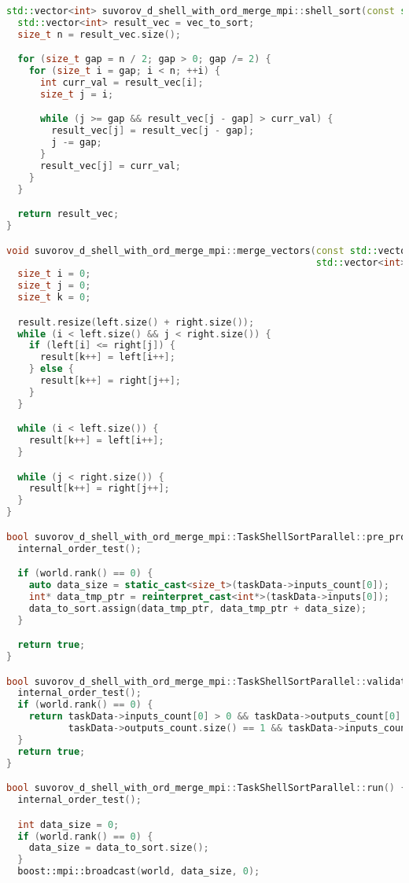 \documentclass{report}
\begin{document}
\begin{lstlisting}[language=C++, caption={Реализация}]
std::vector<int> suvorov_d_shell_with_ord_merge_mpi::shell_sort(const std::vector<int>& vec_to_sort) {
  std::vector<int> result_vec = vec_to_sort;
  size_t n = result_vec.size();

  for (size_t gap = n / 2; gap > 0; gap /= 2) {
    for (size_t i = gap; i < n; ++i) {
      int curr_val = result_vec[i];
      size_t j = i;

      while (j >= gap && result_vec[j - gap] > curr_val) {
        result_vec[j] = result_vec[j - gap];
        j -= gap;
      }
      result_vec[j] = curr_val;
    }
  }

  return result_vec;
}

void suvorov_d_shell_with_ord_merge_mpi::merge_vectors(const std::vector<int>& left, const std::vector<int>& right,
                                                       std::vector<int>& result) {
  size_t i = 0;
  size_t j = 0;
  size_t k = 0;

  result.resize(left.size() + right.size());
  while (i < left.size() && j < right.size()) {
    if (left[i] <= right[j]) {
      result[k++] = left[i++];
    } else {
      result[k++] = right[j++];
    }
  }

  while (i < left.size()) {
    result[k++] = left[i++];
  }

  while (j < right.size()) {
    result[k++] = right[j++];
  }
}

bool suvorov_d_shell_with_ord_merge_mpi::TaskShellSortParallel::pre_processing() {
  internal_order_test();

  if (world.rank() == 0) {
    auto data_size = static_cast<size_t>(taskData->inputs_count[0]);
    int* data_tmp_ptr = reinterpret_cast<int*>(taskData->inputs[0]);
    data_to_sort.assign(data_tmp_ptr, data_tmp_ptr + data_size);
  }

  return true;
}

bool suvorov_d_shell_with_ord_merge_mpi::TaskShellSortParallel::validation() {
  internal_order_test();
  if (world.rank() == 0) {
    return taskData->inputs_count[0] > 0 && taskData->outputs_count[0] > 0 && taskData->inputs_count.size() == 1 &&
           taskData->outputs_count.size() == 1 && taskData->inputs_count[0] == taskData->outputs_count[0];
  }
  return true;
}

bool suvorov_d_shell_with_ord_merge_mpi::TaskShellSortParallel::run() {
  internal_order_test();

  int data_size = 0;
  if (world.rank() == 0) {
    data_size = data_to_sort.size();
  }
  boost::mpi::broadcast(world, data_size, 0);


\end{lstlisting}
\end{document}
